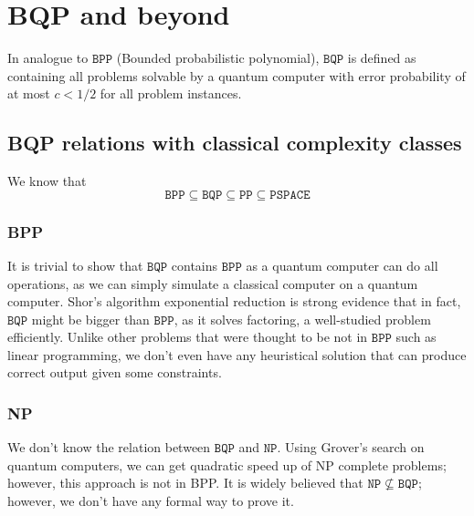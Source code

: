 \section{BQP and beyond}
In analogue to $\mathtt{BPP}$ (Bounded probabilistic polynomial), $\mathtt{BQP}$ is defined as containing all problems solvable by a quantum computer with error probability of at most $c<1/2$ for all problem instances. 
\subsection{BQP relations with classical complexity classes}
We know that 
$$\mathtt{BPP} \subseteq \mathtt{BQP} \subseteq \mathtt{PP} \subseteq \mathtt{PSPACE}$$ 
\subsubsection{BPP}
It is trivial to show that $\mathtt{BQP}$ contains $\mathtt{BPP}$ as a quantum computer can do all operations, as we can simply simulate a classical computer on a quantum computer. Shor's algorithm exponential reduction is strong evidence that in fact, $\mathtt{BQP}$ might be bigger than $\mathtt{BPP}$, as it solves factoring, a well-studied problem efficiently. Unlike other problems that were thought to be not in $\mathtt{BPP}$ such as linear programming, we don't even have any heuristical solution that can produce correct output given some constraints.  
\subsubsection{NP}
We don't know the relation between $\mathtt{BQP}$ and $\mathtt{NP}$. Using Grover's search on quantum computers, we can get quadratic speed up of NP complete problems; however, this approach is not in BPP. It is widely believed that $\mathtt{NP} \nsubseteq \mathtt{BQP}$; however, we don't have any formal way to prove it. 
